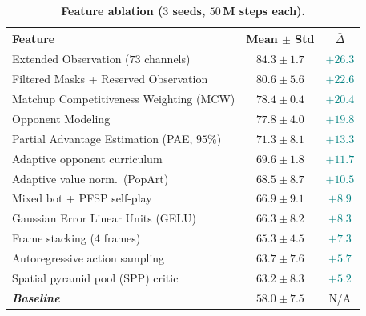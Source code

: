 \documentclass[conference]{IEEEtran}
\begin{document}
\begin{table}[!tb]
\centering
\caption{\textbf{Feature ablation ($3$ seeds, $50$\,M steps each).}}
\label{tab:feat-ablation-summary}
\footnotesize
\setlength{\tabcolsep}{4pt}
\begin{tabularx}{\linewidth}{@{}>{\raggedright\arraybackslash}X | c c@{}}
  \toprule
  \textbf{Feature} & \textbf{Mean $\pm$ Std} & \textbf{$\bar{\Delta}$} \\
  \midrule
  Extended Observation ($73$ channels)~\cite{goodfriendCompetitionWinningDeep2024}    & $84.3 \pm 1.7$ & \textcolor{teal}{$+26.3$} \\
  Filtered Masks + Reserved Observation~\cite{goodfriendCompetitionWinningDeep2024}   & $80.6 \pm 5.6$ & \textcolor{teal}{$+22.6$} \\
  Matchup Competitiveness Weighting (MCW) & $78.4 \pm 0.4$ & \textcolor{teal}{$+20.4$} \\
  Opponent Modeling~\cite{manandharReinforcementActorcriticLearning2024} & $77.8 \pm 4.0$ & \textcolor{teal}{$+19.8$} \\
  \midrule
  Partial Advantage Estimation (PAE, $95$\%)~\cite{jinPartialAdvantageEstimator2025}  & $71.3 \pm 8.1$ & \textcolor{teal}{$+13.3$} \\
  Adaptive opponent curriculum & $69.6 \pm 1.8$ & \textcolor{teal}{$+11.7$} \\
  Adaptive value norm.\ (PopArt)~\cite{vanhasseltLearningValuesMany2016} & $68.5 \pm 8.7$ & \textcolor{teal}{$+10.5$} \\
  Mixed bot + PFSP self-play~\cite{vinyalsGrandmasterLevelStarCraft2019} & $66.9 \pm 9.1$ & \textcolor{teal}{$+8.9$} \\
  Gaussian Error Linear Units (GELU)~\cite{hendrycksGaussianErrorLinear2016}          & $66.3 \pm 8.2$ & \textcolor{teal}{$+8.3$} \\
  Frame stacking ($4$ frames)~\cite{mnihHumanlevelControlDeep2015} & $65.3 \pm 4.5$ & \textcolor{teal}{$+7.3$} \\
  Autoregressive action sampling~\cite{vinyalsGrandmasterLevelStarCraft2019}          & $63.7 \pm 7.6$ & \textcolor{teal}{$+5.7$} \\
  Spatial pyramid pool (SPP) critic~\cite{heSpatialPyramidPooling2015} & $63.2 \pm 8.3$ & \textcolor{teal}{$+5.2$} \\
  \midrule
  \textbf{\textit{Baseline}} & $58.0 \pm 7.5$ & N/A \\
  \bottomrule
  \end{tabularx}
\end{table}
\end{document}

